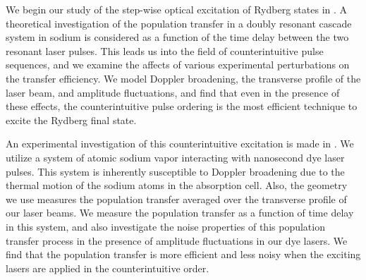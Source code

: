 We begin our study of the step-wise optical excitation of Rydberg states in
.  A theoretical investigation of the population transfer
in a doubly resonant cascade system in sodium is considered as a function of
the time delay between the two resonant laser pulses.  This leads us into the
field of counterintuitive pulse sequences, and we examine the affects of
various experimental perturbations on the transfer efficiency.  We model
Doppler broadening, the transverse profile of the laser beam, and amplitude
fluctuations, and find that even in the presence of these effects, the
counterintuitive pulse ordering is the most efficient technique to excite the
Rydberg final state.

An experimental investigation of this counterintuitive excitation is made in
.  We utilize a system of atomic sodium vapor interacting
with nanosecond dye laser pulses.  This system is inherently susceptible to
Doppler broadening due to the thermal motion of the sodium atoms in the
absorption cell.  Also, the geometry we use measures the population transfer
averaged over the transverse profile of our laser beams.  We measure the
population transfer as a function of time delay in this system, and also
investigate the noise properties of this population transfer process in the
presence of amplitude fluctuations in our dye lasers.  We find that the
population transfer is more efficient and less noisy when the exciting lasers
are applied in the counterintuitive order.

